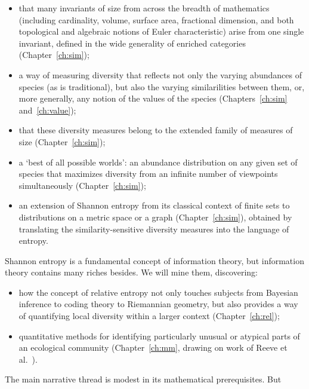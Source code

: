 \begin{itemize}
\item
that many invariants of size from across the breadth of mathematics
(including cardinality, volume, surface area, fractional dimension, and
both topological and algebraic notions of Euler characteristic) arise
from one single invariant, defined in the wide generality of enriched
categories (Chapter~\ref{ch:sim});

\item
a way of measuring diversity that reflects not only the varying abundances
of species (as is traditional), but also the varying similarilities between
them, or, more generally, any notion of the values of the species
(Chapters~\ref{ch:sim} and~\ref{ch:value});

\item
that these diversity measures belong to the extended family of measures
of size (Chapter~\ref{ch:sim});

\item
a `best of all possible worlds': an abundance distribution on any given set
of species that maximizes diversity from an infinite number of viewpoints
simultaneously (Chapter~\ref{ch:sim});

\item
an extension of Shannon entropy from its classical context of finite sets
to distributions on a metric space or a graph (Chapter~\ref{ch:sim}),
obtained by translating the similarity-sensitive diversity measures into
the language of entropy.
\end{itemize}
% 
Shannon entropy is a fundamental concept of information theory, but
information theory contains many riches besides.  We will mine them,
discovering:
% 
\begin{itemize}
\item
how the concept of relative entropy not only touches subjects from
Bayesian inference to coding theory to Riemannian geometry, but also
provides a way of quantifying local diversity within a larger context
(Chapter~\ref{ch:rel});

\item
quantitative methods for identifying particularly unusual or atypical parts of
an ecological community (Chapter~\ref{ch:mm}, drawing on work of Reeve
et al.~\cite{HPD}).
\end{itemize}
% 
The main narrative thread is modest in its mathematical prerequisites.  But
